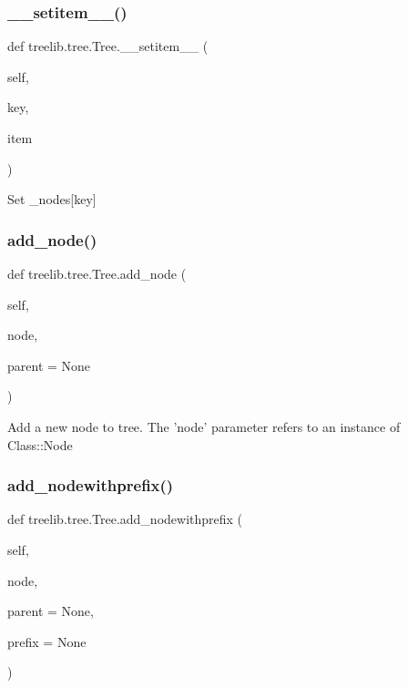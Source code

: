 \subsubsection{\texorpdfstring{\+\_\+\+\_\+setitem\+\_\+\+\_\+()}{\_\_setitem\_\_()}}
{\footnotesize\ttfamily def treelib.\+tree.\+Tree.\+\_\+\+\_\+setitem\+\_\+\+\_\+ (\begin{DoxyParamCaption}\item[{}]{self,  }\item[{}]{key,  }\item[{}]{item }\end{DoxyParamCaption})}

\begin{DoxyVerb}Set _nodes[key]\end{DoxyVerb}
 \mbox{\label{classtreelib_1_1tree_1_1Tree_a82d946c1c679ffe37d2c19a40ae2ac14}} 
\subsubsection{\texorpdfstring{add\+\_\+node()}{add\_node()}}
{\footnotesize\ttfamily def treelib.\+tree.\+Tree.\+add\+\_\+node (\begin{DoxyParamCaption}\item[{}]{self,  }\item[{}]{node,  }\item[{}]{parent = {\ttfamily None} }\end{DoxyParamCaption})}

\begin{DoxyVerb}Add a new node to tree.
The 'node' parameter refers to an instance of Class::Node
\end{DoxyVerb}
 \mbox{\label{classtreelib_1_1tree_1_1Tree_a757cf54d27a10e32a9f30ee0e1bbde28}} 
\subsubsection{\texorpdfstring{add\+\_\+nodewithprefix()}{add\_nodewithprefix()}}
{\footnotesize\ttfamily def treelib.\+tree.\+Tree.\+add\+\_\+nodewithprefix (\begin{DoxyParamCaption}\item[{}]{self,  }\item[{}]{node,  }\item[{}]{parent = {\ttfamily None},  }\item[{}]{prefix = {\ttfamily None} }\end{DoxyParamCaption})}


